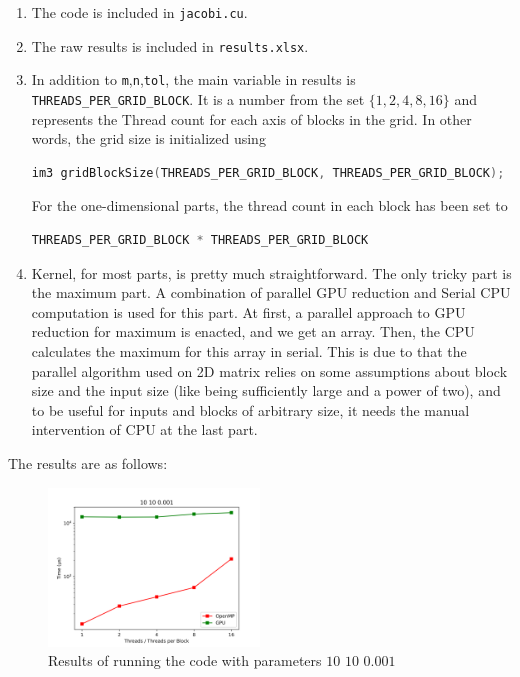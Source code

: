 \documentclass[12pt]{article}
\begin{document}
\begin{enumerate}[label=]
	
	\item 
	The code is included in \Verb+jacobi.cu+.
	
	\item 
	The raw results is included in \Verb+results.xlsx+.
	
	
	\item 
	In addition to \Verb+m+,\Verb+n+,\Verb+tol+, the main variable in results is \Verb+THREADS_PER_GRID_BLOCK+. It is a number from the set $\{1,2,4,8,16\}$ and represents the Thread count for each axis of blocks in the grid. In other words, the grid size is initialized using
	
	\begin{lstlisting}[language=c++]
		im3 gridBlockSize(THREADS_PER_GRID_BLOCK, THREADS_PER_GRID_BLOCK);
	\end{lstlisting}
	
	For the one-dimensional parts, the thread count in each block has been set to
	\begin{lstlisting}[language=c++]
		THREADS_PER_GRID_BLOCK * THREADS_PER_GRID_BLOCK
	\end{lstlisting}
	
	
	\item 
	Kernel, for most parts, is pretty much straightforward. The only tricky part is the maximum part. A combination of parallel GPU reduction and Serial CPU computation is used for this part. At first, a parallel approach to GPU reduction for maximum is enacted, and we get an array. Then, the CPU calculates the maximum for this array in serial. This is due to that the parallel algorithm used on 2D matrix relies on some assumptions about block size and the input size (like being sufficiently large and a power of two), and to be useful for inputs and blocks of arbitrary size, it needs the manual intervention of CPU at the last part.
	
	
	
	
	
\end{enumerate}


The results are as follows:



\begin{figure}[H]
	\centering
	\includegraphics[width=0.5\textwidth]{./images/Q5/10100001.png}	
	\cprotect\caption{Results of running the code with parameters $10$ $10$ $0.001$}
	\label{fig:5-1}
\end{figure}
\end{document}
